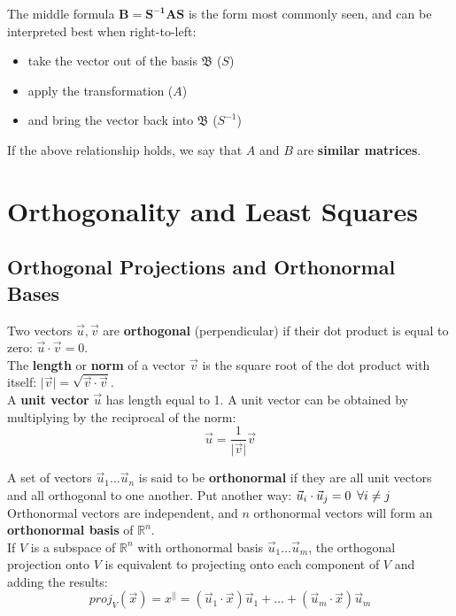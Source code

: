 \documentclass[]{scrartcl}
\begin{document}
	The middle formula $\boldsymbol{B=S^{-1}AS}$ is the form most commonly seen, and can be interpreted best when right-to-left:
	\begin{itemize}
		\item take the vector out of the basis $\mathfrak{B}$ ($S$)
		\item apply the transformation ($A$)
		\item and bring the vector back into $\mathfrak{B}$ ($S^{-1}$)
	\end{itemize}
	
	If the above relationship holds, we say that $A$ and $B$ are \textbf{similar matrices}.
	
	\setcounter{section}{4}
	\section{Orthogonality and Least Squares}
	\subsection{Orthogonal Projections and Orthonormal Bases}
	Two vectors $\vec{u}, \vec{v}$ are \textbf{orthogonal} (perpendicular) if their dot product is equal to zero: $\vec{u} \cdot \vec{v} = 0$.\\
	
	The \textbf{length} or \textbf{norm} of a vector $\vec{v}$ is the square root of the dot product with itself: $\lvert \vec{v} \rvert = \sqrt{\vec{v} \cdot \vec{v}}$.\\
	
	A \textbf{unit vector} $\vec{u}$ has length equal to 1. A unit vector can be obtained by multiplying by the reciprocal of the norm:
	$$
	\vec{u} = \frac{1}{\lvert \vec{v} \rvert} \vec{v}
	$$
	
	A set of vectors $\vec{u}_1 \ldots \vec{u}_n$ is said to be \textbf{orthonormal} if they are all unit vectors and all orthogonal to one another. Put another way: $\vec{u}_i \cdot \vec{u}_j = 0 \enskip \forall i \neq j$\\
	
	Orthonormal vectors are independent, and $n$ orthonormal vectors will form an \textbf{orthonormal basis} of $\mathbb{R}^n$.\\
	
	If $V$ is a subspace of $\mathbb{R}^n$ with orthonormal basis $\vec{u}_1 \ldots \vec{u}_m$, the orthogonal projection onto $V$ is equivalent to projecting onto each component of $V$ and adding the results:
	$$
	proj_V(\vec{x}) = x^\parallel = (\vec{u}_1 \cdot \vec{x})\vec{u}_1 + \ldots + (\vec{u}_m \cdot \vec{x})\vec{u}_m
	$$
	
\end{document}
